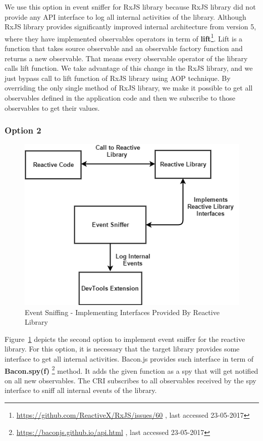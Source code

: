 We use this option in event sniffer for RxJS library because RxJS library did not provide any API interface to log all internal activities of the library.  
Although RxJS library provides significantly improved internal architecture from version 5, where they have implemented observables operators in term of \textbf{lift}\footnote{\url{https://github.com/ReactiveX/RxJS/issues/60} , last accessed 23-05-2017}. Lift is a function that takes source observable and an observable factory function and returns a new observable. That means every observable operator of the library calls lift function. We take advantage of this change in the RxJS library, and we just bypass call to lift function of RxJS library using AOP technique. By overriding the only single method of RxJS library, we make it possible to get all observables defined in the application code and then we subscribe to those observables to get their values.



\subsubsection{Option 2}

\begin{figure}[!h]
	\centering
	\includegraphics[scale=0.5,trim=0 0 0 0]{gfx/EventSniffing2.png}
	\caption{Event Sniffing - Implementing Interfaces Provided By Reactive Library}
	\label{fig:event_sniffing_2}
\end{figure}

Figure~\ref{fig:event_sniffing_2} depicts the second option to implement event sniffer for the reactive library. For this option, it is necessary that the target library provides some interface to get all internal activities.
Bacon.js provides such interface in term of \textbf{Bacon.spy(f)} \footnote{\url{https://baconjs.github.io/api.html} , last accessed 23-05-2017} method. 
It adds the given function as a spy that will get notified on all new observables. The CRI subscribes to all observables received by the spy interface to sniff all internal events of the library. 


